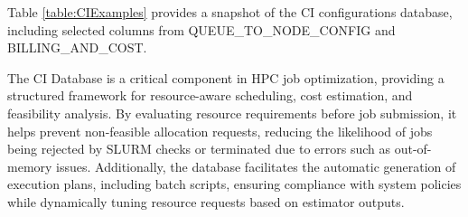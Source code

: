 Table \ref{table:CIExamples} provides a snapshot of the CI configurations database, including selected columns from QUEUE\_TO\_NODE\_CONFIG and BILLING\_AND\_COST.


The CI Database is a critical component in HPC job optimization, providing a structured framework for resource-aware scheduling, cost estimation, and feasibility analysis. By evaluating resource requirements before job submission, it helps prevent non-feasible allocation requests, reducing the likelihood of jobs being rejected by SLURM checks or terminated due to errors such as out-of-memory issues. Additionally, the database facilitates the automatic generation of execution plans, including batch scripts, ensuring compliance with system policies while dynamically tuning resource requests based on estimator outputs.


